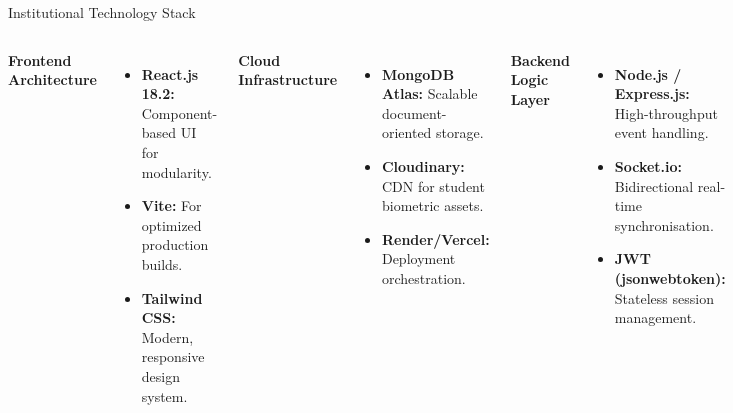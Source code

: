 \documentclass[11pt, aspectratio=169]{beamer}
\begin{document}
\begin{frame}{Institutional Technology Stack}
    \begin{columns}
        \textbf{Frontend Architecture}
        \begin{itemize}
            \item \textbf{React.js 18.2:} Component-based UI for modularity.
            \item \textbf{Vite:} For optimized production builds.
            \item \textbf{Tailwind CSS:} Modern, responsive design system.
        \end{itemize}
        \vspace{0.4cm}
        \textbf{Cloud Infrastructure}
        \begin{itemize}
            \item \textbf{MongoDB Atlas:} Scalable document-oriented storage.
            \item \textbf{Cloudinary:} CDN for student biometric assets.
            \item \textbf{Render/Vercel:} Deployment orchestration.
        \end{itemize}
        \textbf{Backend Logic Layer}
        \begin{itemize}
            \item \textbf{Node.js / Express.js:} High-throughput event handling.
            \item \textbf{Socket.io:} Bidirectional real-time synchronisation.
            \item \textbf{JWT (jsonwebtoken):} Stateless session management.
        \end{itemize}
    \end{columns}
\end{frame}

\end{document}
